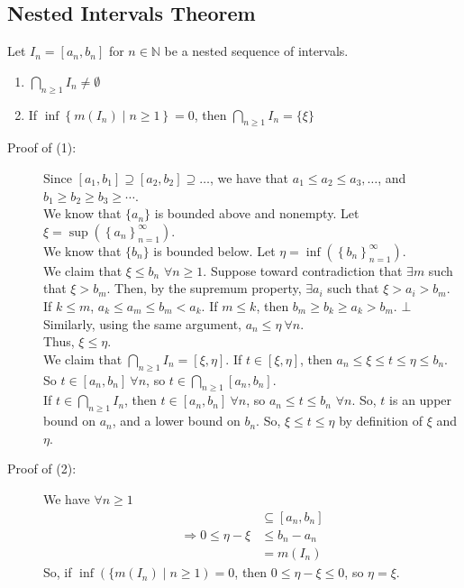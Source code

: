 \documentclass[10pt]{extarticle}
\newcommand{\N}{\mathbb{N}}
\begin{document}
    \subsection{Nested Intervals Theorem}%
    Let $I_n = [a_n,b_n]$ for $n\in\N$ be a nested sequence of intervals.
    \begin{enumerate}[(1)]
      \item $\bigcap_{n \geq 1}I_n \neq \emptyset$
      \item If $\inf\left\{m(I_n)\mid n\geq 1\right\} = 0$, then $\bigcap_{n\geq 1} I_n = \{\xi\}$
    \end{enumerate}
    \begin{description}
      \item[Proof of (1):] Since $[a_1,b_1] \supseteq [a_2,b_2] \supseteq \dots$, we have that $a_1\leq a_2\leq a_3,\dots$, and $b_1 \geq b_2 \geq b_3 \geq \cdots$.\\

      We know that $\{a_n\}$ is bounded above and nonempty. Let $\xi = \sup\left(\left\{a_n\right\}_{n=1}^{\infty}\right)$.\\

      We know that $\{b_n\}$ is bounded below. Let $\eta = \inf\left(\left\{b_n\right\}_{n=1}^{\infty}\right)$.\\

      We claim that $\xi \leq b_n$ $\forall n \geq 1$. Suppose toward contradiction that $\exists m$ such that $\xi > b_m$. Then, by the supremum property, $\exists a_i$ such that $\xi > a_i > b_m$. If $k\leq m$, $a_k \leq a_m \leq b_m < a_k$. If $m \leq k$, then $b_m \geq b_k \geq a_k > b_m$. $\bot$\\

      Similarly, using the same argument, $a_n \leq \eta~\forall n$.\\

      Thus, $\xi \leq \eta$.\\

      We claim that $\bigcap_{n\geq 1} I_n = [\xi,\eta]$. If $t\in [\xi,\eta]$, then $a_n \leq \xi \leq t \leq \eta \leq b_n$. So $t\in [a_n,b_n]~\forall n$, so $t\in \bigcap_{n\geq 1} [a_n,b_n]$.\\

      If $t\in \bigcap_{n\geq 1}I_n$, then $t\in [a_n,b_n]~\forall n$, so $a_n \leq t \leq b_n$ $\forall n$. So, $t$ is an upper bound on $a_n$, and a lower bound on $b_n$. So, $\xi \leq t \leq \eta$ by definition of $\xi$ and $\eta$.
    \item[Proof of (2):] We have $\forall n\geq 1$
      \begin{align*}
        [\xi,\eta] &\subseteq [a_n,b_n]\\
        \Rightarrow 0 \leq \eta-\xi &\leq b_n-a_n\\
                                    &= m(I_n)
      \end{align*}
      So, if $\inf\left(\{m(I_n)\mid n\geq 1\right) = 0$, then $0\leq \eta-\xi \leq 0$, so $\eta = \xi$.
    \end{description}
\end{document}
